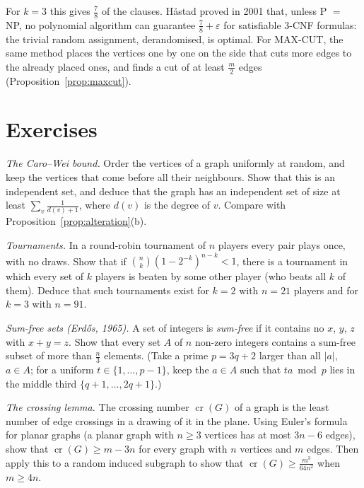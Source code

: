 For $k=3$ this gives $\frac78$ of the clauses. H\aa stad proved in 2001 that, unless P $=$ NP, no polynomial algorithm can guarantee $\frac78+\varepsilon$ for
satisfiable $3$-CNF formulas: the trivial random assignment, derandomised, is optimal. For MAX-CUT, the same method
places the vertices one by one on the side that cuts more edges to the already placed ones, and finds a cut of at least
$\frac m2$ edges (Proposition~\ref{prop:maxcut}).

\section{Exercises}

\begin{exercise}[$\star$]\label{ex:carowei}
\emph{The Caro--Wei bound.} Order the vertices of a graph uniformly at random, and keep the vertices that come before all their
neighbours. Show that this is an independent set, and deduce that the graph has an independent set of size at least
$\sum_v\frac1{d(v)+1}$, where $d(v)$ is the degree of $v$. Compare with Proposition~\ref{prop:alteration}(b).
\end{exercise}

\begin{exercise}[$\star$]\label{ex:tournament}
\emph{Tournaments.} In a round-robin tournament of $n$ players every pair plays once, with no draws. Show that if
$\binom nk(1-2^{-k})^{n-k}<1$, there is a tournament in which every set of $k$ players is beaten by some other player (who beats all $k$ of
them). Deduce that such tournaments exist for $k=2$ with $n=21$ players and for $k=3$ with $n=91$.
\end{exercise}

\begin{exercise}[$\star\star$]\label{ex:sumfree}
\emph{Sum-free sets (Erd\H os, 1965).} A set of integers is \emph{sum-free} if it contains no $x$, $y$, $z$ with $x+y=z$. Show that every set $A$ of $n$
non-zero integers contains a sum-free subset of more than $\frac n3$ elements. (Take a prime $p=3q+2$ larger than all $|a|$, $a\in A$; for a uniform
$t\in\{1,\dots,p-1\}$, keep the $a\in A$ such that $ta\bmod p$ lies in the middle third $\{q+1,\dots,2q+1\}$.)
\end{exercise}

\begin{exercise}[$\star\star$]\label{ex:crossing}
\emph{The crossing lemma.} The crossing number $\operatorname{cr}(G)$ of a graph is the least number of edge crossings in a drawing of it in the plane.
Using Euler's formula for planar graphs (a planar graph with $n\ge3$ vertices has at most $3n-6$ edges), show that $\operatorname{cr}(G)\ge m-3n$ for
every graph with $n$ vertices and $m$ edges. Then apply this to a random induced subgraph to show that $\operatorname{cr}(G)\ge\frac{m^3}{64n^2}$ when $m\ge4n$.
\end{exercise}

